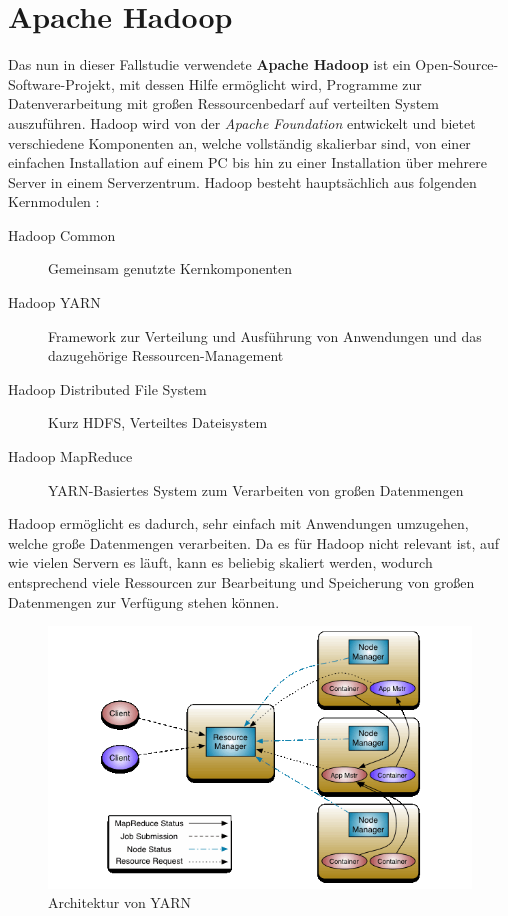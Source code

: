 \section{Apache Hadoop}\label{sec:hadoop}

Das nun in dieser Fallstudie verwendete \textbf{Apache Hadoop} ist ein Open-Source-Software-Projekt, mit dessen Hilfe ermöglicht wird, Programme zur Datenverarbeitung mit großen Ressourcenbedarf auf verteilten System auszuführen. Hadoop wird von der \emph{Apache Foundation} entwickelt und bietet verschiedene Komponenten an, welche vollständig skalierbar sind, von einer einfachen Installation auf einem PC bis hin zu einer Installation über mehrere Server in einem Serverzentrum. Hadoop besteht hauptsächlich aus folgenden Kernmodulen \cite{HadoopHomePage}:

\begin{description}
	\item[Hadoop Common] Gemeinsam genutzte Kernkomponenten
	\item[Hadoop YARN] Framework zur Verteilung und Ausführung von Anwendungen und das dazugehörige Ressourcen-Management
	\item[Hadoop Distributed File System] Kurz HDFS, Verteiltes Dateisystem
	\item[Hadoop MapReduce] YARN-Basiertes System zum Verarbeiten von großen Datenmengen
\end{description}

Hadoop ermöglicht es dadurch, sehr einfach mit Anwendungen umzugehen, welche große Datenmengen verarbeiten. Da es für Hadoop nicht relevant ist, auf wie vielen Servern es läuft, kann es beliebig skaliert werden, wodurch entsprechend viele Ressourcen zur Bearbeitung und Speicherung von großen Datenmengen zur Verfügung stehen können.

\begin{figure}
	\centering
	\includegraphics[width=\columnwidth]{./images/yarn_architecture.png}
	\caption[Architektur von YARN]{Architektur von YARN \cite{HadoopYarnArch271}}
	\label{fig:yarnarch}
\end{figure}

